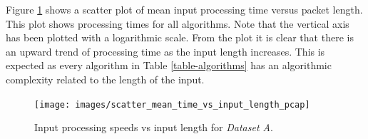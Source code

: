 \documentclass[11pt]{article}
\begin{document}
Figure \ref{figure-speedvslength} shows a scatter plot of mean input processing time versus packet length. This plot shows processing times for all algorithms. Note that the vertical axis has been plotted with a logarithmic scale. From the plot it is clear that there is an upward trend of processing time as the input length increases. This is expected as every algorithm in Table \ref{table-algorithms} has an algorithmic complexity related to the length of the input.

\begin{figure}[!htb]
    \centering
    \texttt{[image: images/scatter\_mean\_time\_vs\_input\_length\_pcap]}
    \caption{Input processing speeds vs input length for \textit{Dataset A}.}
    \label{figure-speedvslength}
\end{figure}
\end{document}
